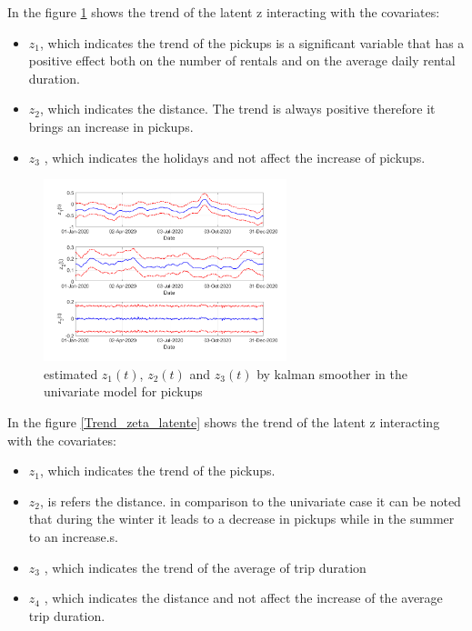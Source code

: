 In the figure \ref{Trend_zeta_latente univariato} shows the trend of the latent z interacting with the covariates:
\begin{itemize}
	\item $z_{1}$, which indicates the trend of the pickups is a significant variable that has a positive effect both on the number of rentals and on the average daily rental duration.
	\item $z_{2}$, which indicates the distance. The trend is always positive therefore it brings an increase in pickups.
	\item $z_{3}$ , which indicates the holidays and not affect the increase of pickups.
\end{itemize}
\begin{figure}
	\centering
	\includegraphics[height=200px]{Images/pickupsfull.png}
	\caption[Estimated of latent z]{estimated $z_{1}(t)$,  $z_{2}(t)$ and $z_{3}(t)$ by kalman smoother in the univariate model for pickups}
	\label{Trend_zeta_latente univariato}
	
\end{figure}
In the figure \ref{Trend_zeta_latente} shows the trend of the latent z interacting with the covariates:
\begin{itemize}
	\item $z_{1}$, which indicates the trend of the pickups.
	\item $z_{2}$, is refers the distance. in comparison to the univariate case it can be noted that during the winter it leads to a decrease in pickups while in the summer to an increase.s.
	\item $z_{3}$ , which indicates the trend of the average of trip duration
	\item $z_{4}$ , which indicates the distance and not affect the increase of the average trip duration.
\end{itemize}
